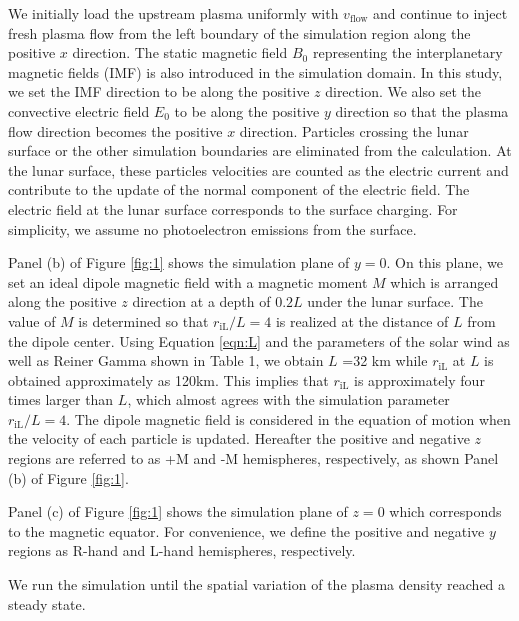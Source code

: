 \documentclass[draft,jgrga]{agutex2015}
\begin{document}
\begin{article}
We initially load the upstream plasma uniformly with $v_\mathrm{flow}$
and continue to inject fresh plasma flow from the left boundary of 
the simulation region along the positive $x$ direction.
The static magnetic field $B_0$ representing the interplanetary magnetic fields (IMF) 
is also introduced in the simulation domain. 
In this study, we set the IMF direction to be along the positive $z$ direction.
We also set the convective electric field $E_0$  
to be along the positive $y$ direction so that 
the plasma flow direction becomes the positive $x$ direction. 
Particles crossing the lunar surface or the other simulation boundaries are 
eliminated from the calculation. 
At the lunar surface, these particles velocities are counted as 
the electric current and contribute to the update of the normal component
of the electric field. 
The electric field at the lunar surface corresponds to the surface charging.
For simplicity, we assume no photoelectron emissions from the surface. 

Panel (b) of Figure \ref{fig:1} shows the simulation plane of $y=0$.
On this plane, we set an ideal dipole magnetic field with 
a magnetic moment $M$ which is arranged along the positive $z$ direction
at a depth of $0.2L$ under the lunar surface.
The value of $M$ is determined so that $r_\mathrm{iL}/L =4$ is realized
at the distance of $L$ from the dipole center.
Using Equation \ref{eqn:L} and the parameters of the solar wind as well as
Reiner Gamma shown in Table 1,
we obtain $L$ =32 km while $r_\mathrm{iL}$ at $L$ is obtained approximately as 120km. 
This implies that 
$r_\mathrm{iL}$ is approximately four times larger than $L$,
which almost agrees with the simulation parameter $r_\mathrm{iL}/L =4$.
The dipole magnetic field is considered in the equation of motion 
when the velocity of each particle is updated. 
Hereafter the positive and negative $z$ regions are referred to as 
+M and -M hemispheres, respectively, as shown Panel (b) of Figure \ref{fig:1}.

Panel (c) of Figure \ref{fig:1} shows the simulation plane of $z=0$
which corresponds to the magnetic equator.
For convenience, 
we define the positive and negative $y$ regions as R-hand and L-hand 
hemispheres, respectively.

We run the simulation until the spatial variation of the plasma density reached a steady state. 
%




\end{article}
\end{document}
